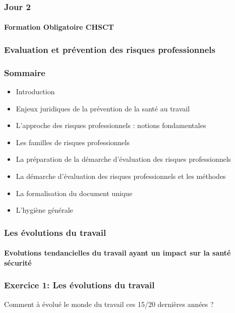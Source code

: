 \documentclass{beamer}
\begin{document}
\begin{frame}
\frametitle{Jour 2}
\framesubtitle{Formation Obligatoire CHSCT}
\end{frame}

\begin{frame}
\frametitle{Evaluation et prévention des risques professionnels}
\end{frame}

\begin{frame}
\frametitle{Sommaire}
\begin{itemize}
\item Introduction
\item Enjeux juridiques de la prévention de la santé au travail
\item L’approche des risques professionnels : notions fondamentales
\item Les familles de risques professionnels
\item La préparation de la démarche d’évaluation des risques professionnels
\item La démarche d’évaluation des risques professionnels et les méthodes
\item La formalisation du document unique
\item L’hygiène générale
\end{itemize}
\end{frame} 

\begin{frame}
\frametitle{Les évolutions du travail}
\framesubtitle{Evolutions tendancielles du travail ayant un impact sur la santé sécurité}
\end{frame} 

\begin{frame}
\frametitle{Exercice 1: Les évolutions du travail}
Comment à évolué le monde du travail ces 15/20 dernières années ?
\end{frame} 
\end{document}
